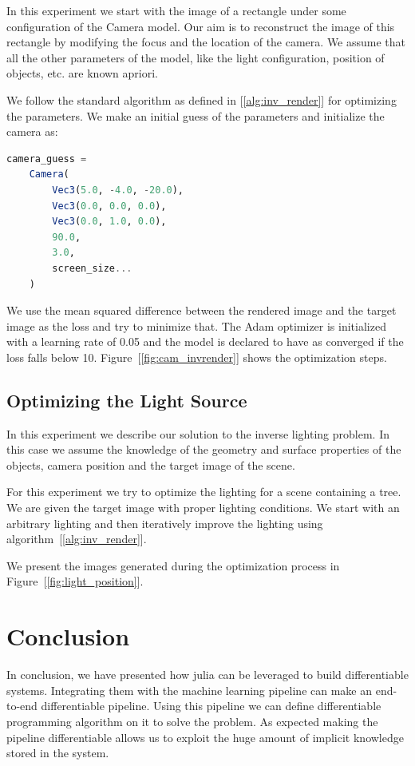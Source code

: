 \documentclass{juliacon}
\begin{document}
In this experiment we start with the image of a rectangle under some configuration of the Camera model. Our aim is to reconstruct the image of this rectangle by modifying the focus and the location of the camera. We assume that all the other parameters of the model, like the light configuration, position of objects, etc. are known apriori.

We follow the standard algorithm as defined in [\ref{alg:inv_render}] for optimizing the parameters. We make an initial guess of the parameters and initialize the camera as:

\begin{lstlisting}[language = Julia]
camera_guess =
    Camera(
        Vec3(5.0, -4.0, -20.0),
        Vec3(0.0, 0.0, 0.0),
        Vec3(0.0, 1.0, 0.0),
        90.0,
        3.0,
        screen_size...
    )
\end{lstlisting}

We use the mean squared difference between the rendered image and the target image as the loss and try to minimize that. The Adam optimizer is initialized with a learning rate of 0.05 and the model is declared to have as converged if the loss falls below 10. Figure~[\ref{fig:cam_invrender}] shows the optimization steps.

\subsection{\textbf{Optimizing the Light Source}}

In this experiment we describe our solution to the inverse lighting problem. In this case we assume the knowledge of the geometry and surface properties of the objects, camera position and the target image of the scene.

For this experiment we try to optimize the lighting for a scene containing a tree. We are given the target image with proper lighting conditions. We start with an arbitrary lighting and then iteratively improve the lighting using algorithm~[\ref{alg:inv_render}].

We present the images generated during the optimization process in Figure~[\ref{fig:light_position}].

\section{Conclusion}
In conclusion, we have presented how julia can be leveraged to build differentiable systems. Integrating them with the machine learning pipeline can make an end-to-end differentiable pipeline. Using this pipeline we can define differentiable programming algorithm on it to solve the problem. As expected making the pipeline differentiable allows us to exploit the huge amount of implicit knowledge stored in the system.




\end{document}
